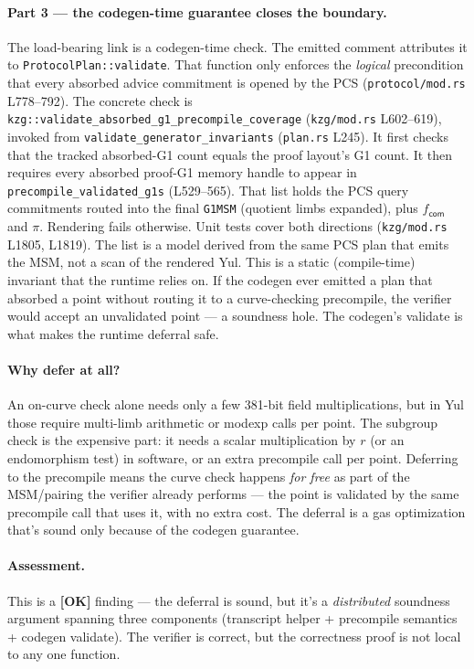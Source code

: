 \paragraph{Part 3 --- the codegen-time guarantee closes the boundary.}
The load-bearing link is a codegen-time check. 
The emitted comment attributes it to \texttt{ProtocolPlan::validate}.
That function only enforces the \emph{logical} precondition that
every absorbed advice commitment is opened by the PCS
(\texttt{protocol/mod.rs} L778--792). The concrete check is
\texttt{kzg::validate\_absorbed\_\allowbreak{}g1\_precompile\_\allowbreak{}coverage}
(\texttt{kzg/mod.rs} L602--619), invoked from
\texttt{validate\_generator\_\allowbreak{}invariants} (\texttt{plan.rs} L245). It
first checks that the tracked absorbed-G1 count equals the proof
layout's G1 count. It then requires every absorbed proof-G1 memory
handle to appear in \texttt{precompile\_\allowbreak{}validated\_g1s}
(L529--565). That list holds the PCS query commitments routed into
the final \texttt{G1MSM} (quotient limbs expanded), plus
$f_{\mathsf{com}}$ and $\pi$. Rendering fails otherwise. Unit tests
cover both directions (\texttt{kzg/mod.rs} L1805, L1819). The list
is a model derived from the same PCS plan that emits the MSM, not a
scan of the rendered Yul. This is a static (compile-time)
invariant that the runtime relies on. If the codegen ever emitted
a plan that absorbed a point without routing it to a
curve-checking precompile, the verifier would accept an
unvalidated point --- a soundness hole. The codegen's validate is
what makes the runtime deferral safe.

\paragraph{Why defer at all?} An on-curve check alone needs only a
few 381-bit field multiplications, but in Yul those require
multi-limb arithmetic or modexp calls per point. The subgroup check
is the expensive part: it needs a scalar multiplication by $r$ (or
an endomorphism test) in software, or an extra precompile call per
point. Deferring to the
precompile means the curve check happens \emph{for free} as part
of the MSM/pairing the verifier already performs --- the point is
validated by the same precompile call that uses it, with no extra
cost. The deferral is a gas optimization that's sound only because
of the codegen guarantee.

\paragraph{Assessment.} This is a
\textcolor{tracegreen}{\textbf{[OK]}} finding --- the deferral is
sound, but it's a \emph{distributed} soundness argument spanning
three components (transcript helper + precompile semantics +
codegen validate). The verifier is correct, but the correctness
proof is not local to any one function.

